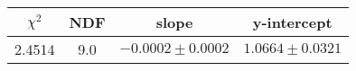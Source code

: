 \begin{tabular}{|c|c|c|c|}

\hline
$\chi^{2}$ & NDF & slope & y-intercept  \\
\hline
2.4514 & 9.0 & $-0.0002\pm0.0002$ & $1.0664\pm0.0321$ \\
\hline

\end{tabular}